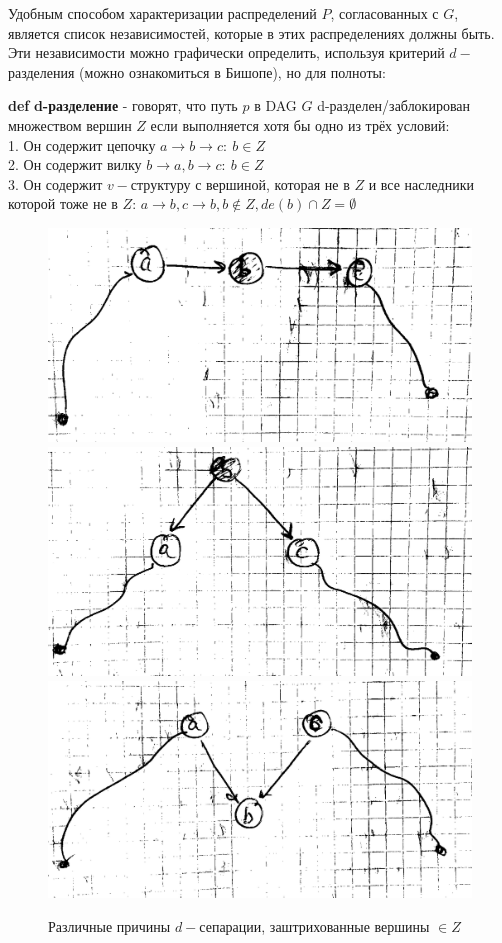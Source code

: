 \documentclass[fleqn]{article}
\def\define#1{\textbf{def} \textbf{#1}}
\begin{document}
Удобным способом характеризации распределений $P$, согласованных с $G$, является список независимостей, которые в этих распределениях должны быть. Эти независимости можно графически определить, используя критерий $d-$разделения (можно ознакомиться в Бишопе), но для полноты:

\define{d-разделение} - говорят, что путь $p$ в DAG $G$ d-разделен/заблокирован множеством вершин $Z$ если выполняется хотя бы одно из трёх условий:\\
1. Он содержит цепочку $a\to b\to c: \ b\in Z$\\
2. Он содержит вилку $b\to a, b\to c: \ b\in Z$\\
3. Он содержит $v-$структуру с вершиной, которая не в $Z$ и все наследники которой тоже не в $Z$: $a\to b, c\to b, b \notin Z, de(b) \cap Z = \emptyset$

\begin{figure}[h]
	\begin{center}
		\includegraphics[scale=0.113]{imgs/img4.png}
	\includegraphics[scale=0.1]{imgs/img5.png}
	\includegraphics[scale=0.105]{imgs/img6.png}
\end{center}
	\caption{Различные причины $d-$сепарации, заштрихованные вершины $\in Z$}
	\label{fig:dsep1}
\end{figure}
\end{document}
